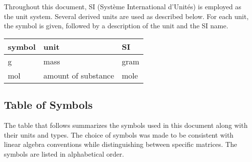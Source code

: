 \documentclass[12pt]{article}
\begin{document}
Throughout this document, SI (Syst\`{e}me International d'Unit\'{e}s) is employed
as the unit system.
Several derived units are
used as described below.  For each unit, the symbol is given, followed by a
description of the unit and the SI name.
~\newline

\renewcommand{\arraystretch}{1.2}
\noindent \begin{tabular}{l l l}
  \toprule
  \textbf{symbol} & \textbf{unit}       & \textbf{SI} \\
  \midrule
  \si{\gram}      & mass                & gram        \\
  \si{\mole}      & amount of substance & mole        \\
  \bottomrule
\end{tabular}


\subsection{Table of Symbols} \label{sec_tabSymbs}

The table that follows summarizes the symbols used in this document along with
their units and types. The choice of symbols was made to be consistent with
linear algebra conventions while distinguishing between specific matrices.  The
symbols are listed in alphabetical order.

\end{document}
